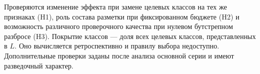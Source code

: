 Проверяются изменение эффекта при замене целевых классов на тех же признаках (H1), роль состава разметки при фиксированном бюджете (H2) и возможность различного проверочного качества при нулевом бутстрепном разбросе (H3). Покрытие классов --- доля всех целевых классов, представленных в $L$. Оно вычисляется ретроспективно и правилу выбора недоступно. Дополнительные проверки заданы после анализа основной серии и имеют разведочный характер.
